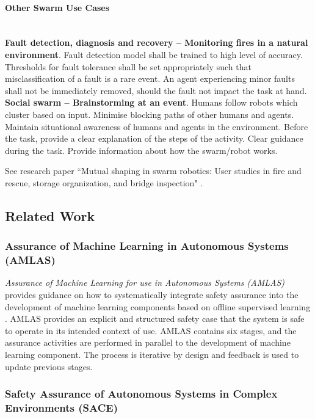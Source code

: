 \documentclass[lettersize,journal]{IEEEtran}
\begin{document}
\paragraph*{Other Swarm Use Cases}
\textbf{\\Fault detection, diagnosis and recovery – Monitoring fires in a natural environment}. Fault detection model shall be trained to high level of accuracy. Thresholds for fault tolerance shall be set appropriately such that misclassification of a fault is a rare event. An agent experiencing minor faults shall not be immediately removed, should the fault not impact the task at hand. \\
\textbf{\noindent Social swarm – Brainstorming at an event}. Humans follow robots which cluster based on input. Minimise blocking paths of other humans and agents. Maintain situational awareness of humans and agents in the environment. Before the task, provide a clear explanation of the steps of the activity. Clear guidance during the task. Provide information about how the swarm/robot works.

\noindent See research paper ``Mutual shaping in swarm robotics: User studies in fire and rescue, storage organization, and bridge inspection" \cite{Carrillo-Zapata2020}.

\subsection{Related Work}\label{relatedwork}

\subsubsection{Assurance of Machine Learning in Autonomous Systems (AMLAS)}
\textit{Assurance of Machine Learning for use in Autonomous Systems (AMLAS)} provides guidance on how to systematically integrate safety assurance into the development of machine learning components based on offline supervised learning \cite{AMLAS2021}. 
AMLAS provides an explicit and structured safety case that the system is safe to operate in its intended context of use. 
AMLAS contains six stages, and the assurance activities are performed in parallel to the development of machine learning component. 
The process is iterative by design and feedback is used to update previous stages. 

\subsubsection{Safety Assurance of Autonomous Systems in Complex Environments (SACE)}
\cite{SACE2022}
\end{document}

